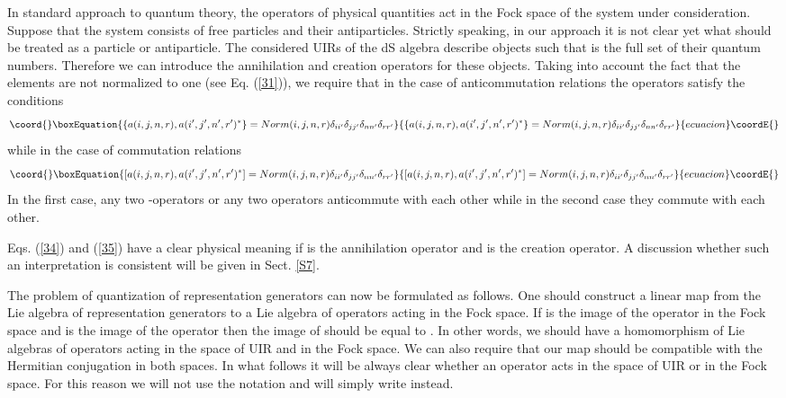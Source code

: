 \documentclass[a4paper,12pt]{article}%
\begin{document}
In standard approach to quantum theory, the operators of 
physical quantities act in the Fock space of the system under 
consideration. Suppose that the system consists
of free particles and their antiparticles.
Strictly speaking, in our approach it is not clear yet
what should be treated as a particle or antiparticle.
The considered UIRs of the dS algebra describe objects
such that \coordHE{} is the full set of
their quantum numbers. Therefore we can introduce the
annihilation and creation operators 
\coordHE{} for these objects. 
Taking into account the fact that the elements \coordHE{}
are not normalized to one (see Eq. (\ref{31})), we require
that in the case of anticommutation relations the 
operators \coordHE{} satisfy the conditions
\begin{equation}\coord{}\boxEquation{
\{a(i,j,n,r),a(i',j',n',r')^*\}=Norm(i,j,n,r)
\delta_{ii'}\delta_{jj'}\delta_{nn'}\delta_{rr'}
\label{34}
}{
\{a(i,j,n,r),a(i',j',n',r')^*\}=Norm(i,j,n,r)
\delta_{ii'}\delta_{jj'}\delta_{nn'}\delta_{rr'}
}{ecuacion}\coordE{}\end{equation}
while in the case of commutation relations
\begin{equation}\coord{}\boxEquation{
[a(i,j,n,r),a(i',j',n',r')^*]=Norm(i,j,n,r)
\delta_{ii'}\delta_{jj'}\delta_{nn'}\delta_{rr'}
\label{35}
}{
[a(i,j,n,r),a(i',j',n',r')^*]=Norm(i,j,n,r)
\delta_{ii'}\delta_{jj'}\delta_{nn'}\delta_{rr'}
}{ecuacion}\coordE{}\end{equation}
In the first case, any two \coordHE{}-operators or any two
\coordHE{} operators anticommute with each other while
in the second case they commute with each other.

Eqs. (\ref{34}) and (\ref{35}) have a clear physical
meaning if \coordHE{} is the annihilation operator and \coordHE{}
is the creation operator. A discussion whether
such an interpretation is consistent will be
given in Sect. \ref{S7}.

The problem of quantization of representation 
generators can now be formulated as follows. 
One should construct a linear map \coordHE{} from 
the Lie algebra of representation generators to a 
Lie algebra of operators acting in the Fock space. 
If \coordHE{} is the image of the operator
\coordHE{} in the Fock space and \coordHE{} 
is the image of the operator \coordHE{} then the
image of \myHighlight{$[M_{ab},M_{cd}]$}\coordHE{} should be equal to  
\myHighlight{$[{\it F}(M_{ab}),{\it F}(M_{cd})]$}\coordHE{}.
In other words, we should have a homomorphism
of Lie algebras of operators acting in the space of UIR
and in the Fock space. We can also require that our 
map should be compatible with the Hermitian
conjugation in both spaces. In what follows it will
be always clear whether an operator acts in the
space of UIR or in the Fock space. For this reason
we will not use the notation \coordHE{}
and will simply write \coordHE{} instead.
\end{document}
